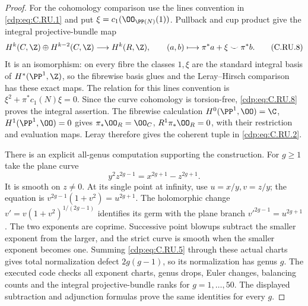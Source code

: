 \begin{proof}
For the cohomology comparison use the lines convention in \eqref{cdp:eq:C.RU.1} and
put $\xi=c_1(\OO_{\PP(N)}(1))$. Pullback and cup product give the integral
projective-bundle map
\[
 H^k(C,\Z)\oplus H^{k-2}(C,\Z)
       \longrightarrow H^k(R,\Z),\qquad
 (a,b)\longmapsto\pi^*a+\xi\smile\pi^*b.
\tag{C.RU.8}\label{cdp:eq:C.RU.8}
\]
It is an isomorphism: on every fibre the classes $1,\xi$ are the standard
integral basis of $H^*(\PP^1,\Z)$, so the fibrewise basis glues and the
Leray--Hirsch comparison has these exact maps. The relation for this lines
convention is $\xi^2+\pi^*c_1(N)\xi=0$. Since the curve cohomology is
torsion-free, \eqref{cdp:eq:C.RU.8} proves the integral assertion. The fibrewise
calculation $H^0(\PP^1,\OO)=\C$, $H^1(\PP^1,\OO)=0$ gives
$\pi_*\OO_R=\OO_C$, $R^1\pi_*\OO_R=0$, with their restriction and
evaluation maps. Leray therefore gives the coherent tuple in \eqref{cdp:eq:C.RU.2}.

There is an explicit all-genus computation supporting the construction.
For $g\ge1$ take the plane curve
\[
                 y^2z^{2g-1}=x^{2g+1}-z^{2g+1}.
\tag{C.RU.9}\label{cdp:eq:C.RU.9}
\]
It is smooth on $z\ne0$. At its single point at infinity, use
$u=x/y,v=z/y$; the equation is $v^{2g-1}(1+v^2)=u^{2g+1}$.
The holomorphic change $v'=v(1+v^2)^{1/(2g-1)}$ identifies its germ with
the plane branch $v'^{2g-1}=u^{2g+1}$. The two exponents are coprime.
Successive point blowups subtract the smaller exponent from the larger,
and the strict curve is smooth when the smaller exponent becomes one.
Summing \eqref{cdp:eq:C.RU.5} through these actual charts gives total normalization
defect $2g(g-1)$, so its normalization has genus $g$.
The executed code  checks all exponent
charts, genus drops, Euler changes, balancing counts and the integral
projective-bundle ranks for $g=1,\ldots,50$. The displayed subtraction
and adjunction formulas prove the same identities for every $g$.
\end{proof}


